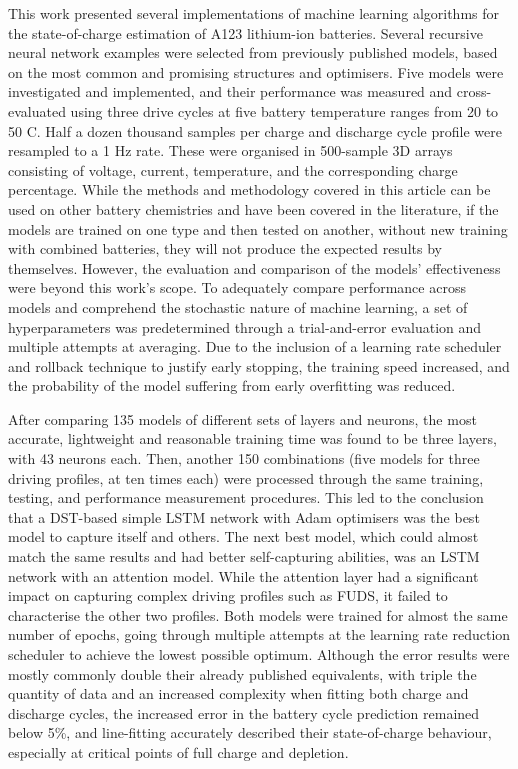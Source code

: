 
%
%
This work presented several implementations of machine learning algorithms for the state-of-charge estimation of A123 lithium-ion batteries.
Several recursive neural network examples were selected from previously published models, based on the most common and promising structures and optimisers.
Five models were investigated and implemented, and their performance was measured and cross-evaluated using three drive cycles at five battery temperature ranges  from 20 to 50 \textdegree{}C.
Half a dozen thousand samples per charge and discharge cycle profile were resampled to a 1 Hz rate.
These were organised in 500-sample 3D arrays consisting of voltage, current, temperature, and the corresponding charge percentage.
While the methods and methodology covered in this article can be used on other battery chemistries and have been covered in the literature, if the models are trained on one type and then tested on another, without new training with combined batteries, they will not produce the expected results by themselves.
However, the evaluation and comparison of the models' effectiveness were beyond this work's scope.
To adequately compare performance across models and comprehend the stochastic nature of machine learning, a set of hyperparameters was predetermined through a trial-and-error evaluation and multiple attempts at averaging.
Due to the inclusion of a learning rate scheduler and rollback technique to justify early stopping, the training speed increased, and the probability of the model suffering from early overfitting was reduced.

%
%
After comparing 135 models of different sets of layers and neurons, the most accurate, lightweight and reasonable training time was found to be three layers, with 43 neurons each.
Then, another 150 combinations (five models for three driving profiles, at ten times each) were processed through the same training, testing, and performance measurement procedures. This led to the conclusion that a DST-based simple LSTM network with Adam optimisers was the best model to capture itself and others.
The next best model, which could almost match the same results and had better self-capturing abilities, was an LSTM network with an attention model.
While the attention layer had a significant impact on capturing complex driving profiles such as FUDS, it failed to characterise the other two profiles.
Both models were trained for almost the same number of epochs, going through multiple attempts at the learning rate reduction scheduler to achieve the lowest possible optimum.
Although the error results were mostly commonly double their already published equivalents, with triple the quantity of data and an increased complexity when fitting both charge and discharge cycles, the increased error in the battery cycle prediction remained below 5\%, and line-fitting accurately described their state-of-charge behaviour, especially at critical points of full charge and depletion.

